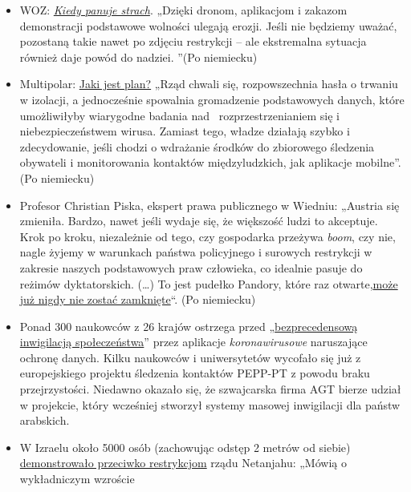 \begin{itemize}
\tightlist
\item
  WOZ:
  \emph{\href{https://www.woz.ch/2016/grundrechte/wenn-die-angst-regiert}{Kiedy
  panuje strach}}. „Dzięki dronom, aplikacjom i zakazom demonstracji
  podstawowe wolności ulegają erozji. Jeśli nie będziemy uważać,
  pozostaną takie nawet po zdjęciu restrykcji -- ale ekstremalna
  sytuacja również daje powód do nadziei. ''(Po niemiecku)
\item
  Multipolar:
  \href{https://multipolar-magazin.de/artikel/die-massnahmen-wirken}{Jaki
  jest plan?} „Rząd chwali się, rozpowszechnia hasła o trwaniu w
  izolacji, a jednocześnie spowalnia gromadzenie podstawowych danych,
  które umożliwiłyby wiarygodne badania nad~ rozprzestrzenianiem się i
  niebezpieczeństwem wirusa. Zamiast tego, władze działają szybko i
  zdecydowanie, jeśli chodzi o wdrażanie środków do zbiorowego śledzenia
  obywateli i monitorowania kontaktów międzyludzkich, jak aplikacje
  mobilne''. (Po niemiecku)
\item
  Profesor Christian Piska, ekspert prawa publicznego w Wiedniu:
  „Austria się zmieniła. Bardzo, nawet jeśli wydaje się, że większość
  ludzi to akceptuje. Krok po kroku, niezależnie od tego, czy gospodarka
  przeżywa \emph{boom}, czy nie, nagle żyjemy w warunkach państwa
  policyjnego i surowych restrykcji w zakresie naszych podstawowych praw
  człowieka, co idealnie pasuje do reżimów dyktatorskich. (\ldots{}) To
  jest pudełko Pandory, które raz
  otwarte,\href{https://kurier.at/meinung/das-juristische-totschlagargument-vom-menschenleben/400814570}{może
  już nigdy nie zostać zamknięte}``. (Po niemiecku)
\item
  Ponad 300 naukowców z 26 krajów ostrzega przed
  „\href{https://www.golem.de/news/corona-app-300-wissenschaftler-warnen-vor-zentraler-datenspeicherung-2004-147973.html}{bezprecedensową
  inwigilacją społeczeństwa}'' przez aplikacje \emph{koronawirusowe}
  naruszające ochronę danych. Kilku naukowców i uniwersytetów wycofało
  się już z europejskiego projektu śledzenia kontaktów PEPP-PT z powodu
  braku przejrzystości. Niedawno okazało się, że szwajcarska firma AGT
  bierze udział w projekcie, który wcześniej stworzył systemy masowej
  inwigilacji dla państw arabskich.
\item
  W Izraelu około 5000 osób (zachowując odstęp 2 metrów od siebie)
  \href{https://edition.cnn.com/2020/04/20/middleeast/israel-protest-social-distancing-intl/index.html}{demonstrowało
  przeciwko restrykcjom} rządu Netanjahu: „Mówią o wykładniczym wzroście

\end{itemize}
